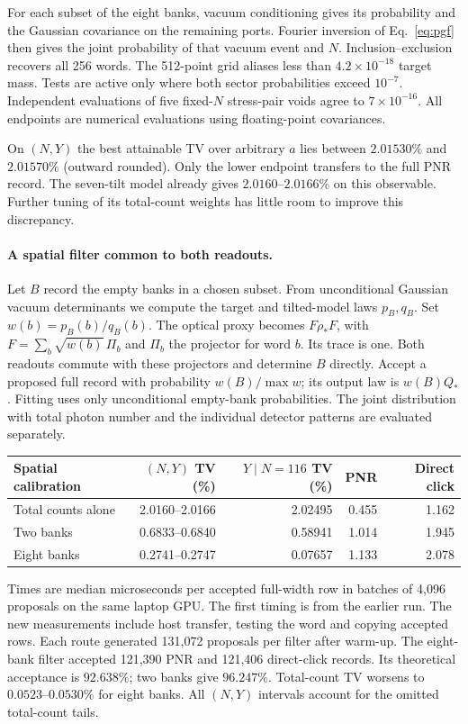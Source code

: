 \documentclass[11pt]{article}
\begin{document}
For each subset of the eight banks, vacuum conditioning gives its probability and the Gaussian covariance on the remaining ports. Fourier inversion of Eq.~\eqref{eq:pgf} then gives the joint probability of that vacuum event and $N$. Inclusion--exclusion recovers all 256 words. The 512-point grid aliases less than $4.2\times10^{-18}$ target mass. Tests are active only where both sector probabilities exceed $10^{-7}$. Independent evaluations of five fixed-$N$ stress-pair voids agree to $7\times10^{-16}$. All endpoints are numerical evaluations using floating-point covariances.

On $(N,Y)$ the best attainable TV over arbitrary $a$ lies between $2.01530\%$ and $2.01570\%$ (outward rounded). Only the lower endpoint transfers to the full PNR record. The seven-tilt model already gives $2.0160$--$2.0166\%$ on this observable. Further tuning of its total-count weights has little room to improve this discrepancy.

\paragraph{A spatial filter common to both readouts.}
Let $B$ record the empty banks in a chosen subset. From unconditional Gaussian vacuum determinants we compute the target and tilted-model laws $p_B,q_B$. Set $w(b)=p_B(b)/q_B(b)$. The optical proxy becomes $F\rho_*F$, with $F=\sum_b\sqrt{w(b)}\,\Pi_b$ and $\Pi_b$ the projector for word $b$. Its trace is one. Both readouts commute with these projectors and determine $B$ directly. Accept a proposed full record with probability $w(B)/\max w$; its output law is $w(B)Q_*$. Fitting uses only unconditional empty-bank probabilities. The joint distribution with total photon number and the individual detector patterns are evaluated separately.

\begin{center}\small
\begin{tabular}{lrrrr}
\toprule
Spatial calibration & $(N,Y)$ TV (\%) & $Y\mid N{=}116$ TV (\%) & PNR & Direct click\\
\midrule
Total counts alone & 2.0160--2.0166 & 2.02495 & 0.455 & 1.162\\
Two banks & 0.6833--0.6840 & 0.58941 & 1.014 & 1.945\\
Eight banks & 0.2741--0.2747 & 0.07657 & 1.133 & 2.078\\
\bottomrule
\end{tabular}
\end{center}
Times are median microseconds per accepted full-width row in batches of 4,096 proposals on the same laptop GPU. The first timing is from the earlier run. The new measurements include host transfer, testing the word and copying accepted rows. Each route generated 131,072 proposals per filter after warm-up. The eight-bank filter accepted 121,390 PNR and 121,406 direct-click records. Its theoretical acceptance is $92.638\%$; two banks give $96.247\%$. Total-count TV worsens to $0.0523$--$0.0530\%$ for eight banks. All $(N,Y)$ intervals account for the omitted total-count tails.
\end{document}
